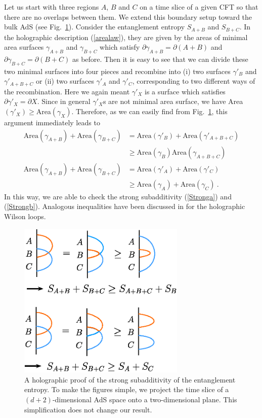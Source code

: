 \documentclass[12pt]{article}
\def\de{\partial}
\def\no{\nonumber \\}
\begin{document}
Let us start with three regions $A$, $B$ and $C$ on a time slice of a given CFT so that there are no
overlaps between them. We extend this boundary setup toward the bulk AdS
(see Fig.\ \ref{Fig:SSA}).
Consider the entanglement entropy $S_{A+B}$ and $S_{B+C}$. In the holographic
description (\ref{arealaw}), they are given by the areas of minimal area surfaces $\gamma_{A+B}$ and
$\gamma_{B+C}$ which satisfy $\de \gamma_{A+B}=\de (A+B)$ and $\de \gamma_{B+C}=\de (B+C)$ as before.
Then it is easy to see that we can divide these two minimal surfaces into four pieces and
recombine into (i) two surfaces $\gamma'_B$ and $\gamma'_{A+B+C}$
or (ii) two surfaces $\gamma'_A$ and $\gamma'_C$, corresponding to two different ways of the
recombination. Here we again
meant $\gamma'_X$ is a surface which satisfies $\de \gamma'_X=\de X$.
Since in general $\gamma'_X$s are not minimal area surface, we have Area$(\gamma'_X)\geq $Area$(\gamma_X)$.
Therefore, as we can easily find from Fig.\ \ref{Fig:SSA}, this argument immediately leads to
\begin{align}
\mbox{Area}(\gamma_{A+B})+\mbox{Area}(\gamma_{B+C})
&=\mbox{Area}(\gamma'_{B})+\mbox{Area}(\gamma'_{A+B+C})\no
& \geq
\mbox{Area}(\gamma_{B})\mbox{Area}(\gamma_{A+B+C})\no
\mbox{Area}(\gamma_{A+B})+\mbox{Area}(\gamma_{B+C})
&=\mbox{Area}(\gamma'_{A})+\mbox{Area}(\gamma'_{C})\no
&\geq
\mbox{Area}(\gamma_{A})+\mbox{Area}(\gamma_{C}) \ .
\end{align}
In this way, we are able to check the strong subadditivity (\ref{Stronga}) and (\ref{Strongb}).
Analogous inequalities have been discussed in \cite{Hirata:2008ms} for the holographic
Wilson loops.


\begin{figure}
\begin{center}
\includegraphics[width=8cm,clip]{SSA.eps}
\end{center}
\caption{
\label{Fig:SSA}
A holographic proof of the strong subadditivity of the entanglement entropy. To make the figures simple,
we project the time slice of a $(d+2)$-dimensional AdS space onto a two-dimensional plane. This
simplification does not change our result.}
\end{figure}
\end{document}

